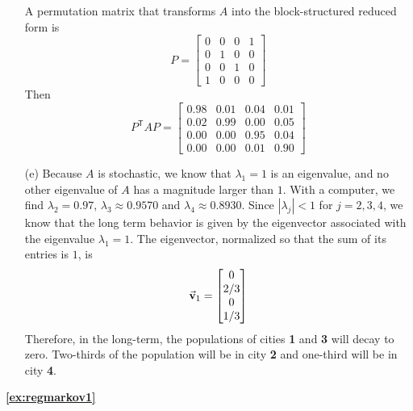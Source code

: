\begin{enumerate}
A permutation matrix that transforms $A$ into
the block-structured reduced form is
\[
  P = \begin{bmatrix}
          0 & 0 & 0 & 1 \\
	  0 & 1 & 0 & 0 \\
	  0 & 0 & 1 & 0 \\
	  1 & 0 & 0 & 0
      \end{bmatrix}
\]
Then
\[
  P^{\textsf{T}}AP = \begin{bmatrix}
                      0.98 & 0.01 & 0.04 & 0.01 \\
		      0.02 & 0.99 & 0.00 & 0.05 \\
		      0.00 & 0.00 & 0.95 & 0.04 \\
		      0.00 & 0.00 & 0.01 & 0.90
                    \end{bmatrix}
\]
\item[(e)]
Because $A$ is stochastic, we know that $\lambda_1=1$
is an eigenvalue, and no other eigenvalue of $A$
has a magnitude larger than $1$.  With a computer,
we find $\lambda_2 = 0.97$, $\lambda_3 \approx 0.9570$
and $\lambda_4 \approx 0.8930$.
Since $|\lambda_j| < 1$ for $j=2,3,4$, 
we know that the long term behavior is given
by the eigenvector associated with the eigenvalue
$\lambda_1=1$.
The eigenvector, normalized so that the sum of
its entries is $1$, is
\[
  \vec{\textbf{v}}_1 = \begin{bmatrix}
             0 \\ 2/3 \\ 0  \\ 1/3
          \end{bmatrix}
\]
Therefore, in the long-term, the populations of
cities \textbf{1} and \textbf{3} will decay to zero.  Two-thirds
of the population will be in city \textbf{2} and one-third
will be in city \textbf{4}.

\end{enumerate}
%
%
\newpage
%
\textbf{\ref{ex:regmarkov1}}
